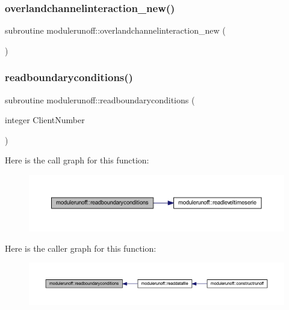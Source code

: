 \subsubsection{\texorpdfstring{overlandchannelinteraction\+\_\+new()}{overlandchannelinteraction\_new()}}
{\footnotesize\ttfamily subroutine modulerunoff\+::overlandchannelinteraction\+\_\+new (\begin{DoxyParamCaption}{ }\end{DoxyParamCaption})\hspace{0.3cm}{\ttfamily [private]}}

\mbox{\label{namespacemodulerunoff_ad906e87c7318e0ecc61ef60d8121f37c}} 
\subsubsection{\texorpdfstring{readboundaryconditions()}{readboundaryconditions()}}
{\footnotesize\ttfamily subroutine modulerunoff\+::readboundaryconditions (\begin{DoxyParamCaption}\item[{integer}]{Client\+Number }\end{DoxyParamCaption})\hspace{0.3cm}{\ttfamily [private]}}

Here is the call graph for this function\+:
\nopagebreak
\begin{figure}[H]
\begin{center}
\leavevmode
\includegraphics[width=350pt]{namespacemodulerunoff_ad906e87c7318e0ecc61ef60d8121f37c_cgraph}
\end{center}
\end{figure}
Here is the caller graph for this function\+:
\nopagebreak
\begin{figure}[H]
\begin{center}
\leavevmode
\includegraphics[width=350pt]{namespacemodulerunoff_ad906e87c7318e0ecc61ef60d8121f37c_icgraph}
\end{center}
\end{figure}
\mbox{\label{namespacemodulerunoff_a82e45fea3cfee6af75a962d5a7d2224b}} 

